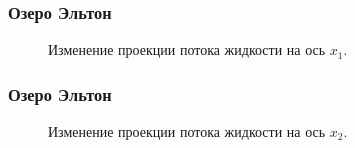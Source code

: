 \documentclass[10pt,utf8,presentation,compress]{beamer}
\begin{document}
\begin{frame}
\frametitle{Озеро Эльтон}
	\begin{figure}[H]
		\centering
		\hfill
		\caption{Изменение проекции потока жидкости на ось $x_1$.}
	\end{figure}
\end{frame}

\begin{frame}
\frametitle{Озеро Эльтон}
	\begin{figure}[H]
		\centering
		\hfill
		\caption{Изменение проекции потока жидкости на ось $x_2$.}
	\end{figure}
\end{frame}
\end{document}
